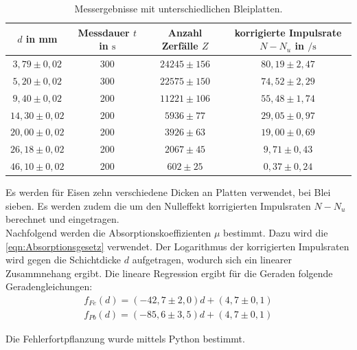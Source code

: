 \begin{table}
  \centering
  \caption{Messergebnisse mit unterschiedlichen Bleiplatten.}
  \label{tab:1aPb}
  \begin{tabular}{c c c c}
    $d$ in \si{\milli\meter} & Messdauer $t$ in $\si{\second}$ & Anzahl Zerfälle $Z$  &  korrigierte Impulsrate $N-N_u$ in $\si{\per\second}$\\
       \midrule
        $3,79 \pm 0,02$   &  300   &  $24245 \pm 156$ & $80,19 \pm 2,47$ \\
        $5,20 \pm 0,02$   &  300   &  $22575 \pm 150$ & $74,52 \pm 2,29$\\
        $9,40 \pm 0,02$   &  200   &  $11221 \pm 106$ & $55,48 \pm 1,74$\\
        $14,30 \pm 0,02$  &  200   &  $5936  \pm 77$ & $29,05 \pm 0,97$\\
        $20,00 \pm 0,02$  &  200   &  $3926  \pm 63$ & $19,00 \pm 0,69$\\
        $26,18 \pm 0,02$  &  200   &  $2067  \pm 45$ & $9,71 \pm 0,43$\\
        $46,10 \pm 0,02$  &  200   &  $602   \pm 25$ & $0,37 \pm 0,24$\\
      \bottomrule
    \end{tabular}
\end{table}

Es werden für Eisen zehn verschiedene Dicken an Platten verwendet, bei Blei sieben. Es werden zudem 
die um den Nulleffekt korrigierten Impulsraten $N-N_u$ berechnet und eingetragen.\\
Nachfolgend werden die Absorptionskoeffizienten $ \mu $ bestimmt. Dazu wird die \autoref{eqn:Absorptionsgesetz}
verwendet. Der Logarithmus der korrigierten Impulsraten wird gegen die Schichtdicke $d$ aufgetragen, wodurch sich
ein linearer Zusammnehang ergibt. Die lineare Regression ergibt für die Geraden folgende Geradengleichungen:
\begin{align*}
  f_{Fe}(d) = (-42,7 \pm 2,0)d + (4,7 \pm 0,1)\\
  f_{Pb}(d) = (-85,6 \pm 3,5)d + (4,7 \pm 0,1)
\end{align*}

Die Fehlerfortpflanzung wurde mittels Python bestimmt.

